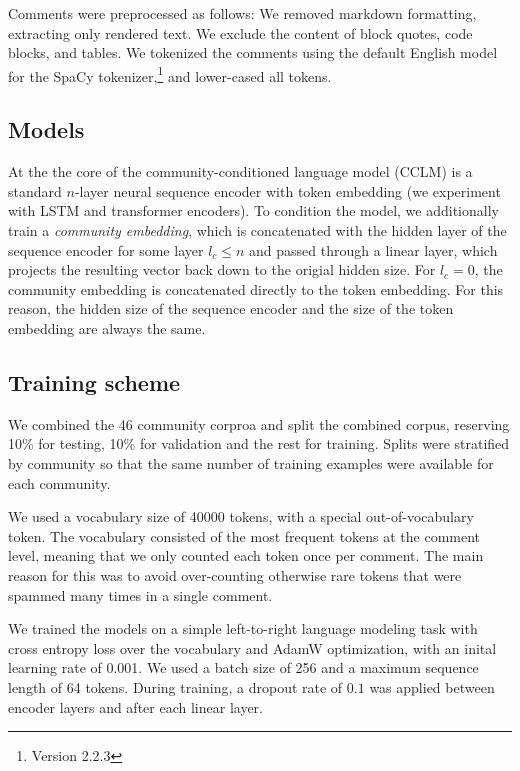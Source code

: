 \documentclass[11pt,a4paper]{article}
\begin{document}
Comments were preprocessed as follows: 
We removed markdown formatting, extracting only rendered text. 
We exclude the content of block quotes, code blocks, and tables. 
We tokenized the comments using the default English model for the SpaCy tokenizer,\footnote{Version 2.2.3}
and lower-cased all tokens. 

\subsection{Models}

At the the core of the community-conditioned language model (CCLM) 
is a standard $n$-layer neural sequence encoder 
with token embedding (we experiment with LSTM and transformer encoders).
To condition the model, we additionally train a \emph{community embedding},
which is concatenated with the hidden layer of the sequence encoder
for some layer $l_c \leq n$ and passed through a linear layer, 
which projects the resulting vector back down to the origial hidden size.
For $l_c=0$, the community embedding is concatenated directly to the token embedding.
For this reason, the hidden size of the sequence encoder 
and the size of the token embedding are always the same.

\subsection{Training scheme}

We combined the 46 community corproa and split the combined corpus,
reserving 10\% for testing, 10\% for validation and the rest for training.
Splits were stratified by community so that the same number of training examples
were available for each community.

We used a vocabulary size of \num{40000} tokens, with a special out-of-vocabulary token.
The vocabulary consisted of the most frequent tokens at the comment level,
meaning that we only counted each token once per comment.
The main reason for this was to avoid over-counting otherwise rare tokens that were spammed
many times in a single comment.

We trained the models on a simple left-to-right language modeling task 
with cross entropy loss over the vocabulary 
and AdamW \citep{Loshchilov2019} optimization, with an inital learning rate of \num{0.001}.
We used a batch size of \num{256} and a maximum sequence length of \num{64} tokens.
During training, a dropout rate of $0.1$ was applied between encoder layers 
and after each linear layer.
\end{document}
